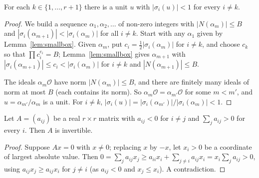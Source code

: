 \begin{lemma}\label{lem:onebig}
For each $k\in\{1,\dots,r+1\}$ there is a unit $u$ with $|\sigma_i(u)|<1$ for every $i\ne k$.
\end{lemma}
\begin{proof}
We build a sequence $\alpha_1,\alpha_2,\dots$ of non-zero integers with $|N(\alpha_m)|\le B$ and $|\sigma_i(\alpha_{m+1})|<
|\sigma_i(\alpha_m)|$ for all $i\ne k$. Start with any $\alpha_1$ given by Lemma~\ref{lem:smallbox}. Given $\alpha_m$, put
$c_i=\frac12|\sigma_i(\alpha_m)|$ for $i\ne k$, and choose $c_k$ so that $\prod c_i^{e_i}=B$; Lemma~\ref{lem:smallbox} gives
$\alpha_{m+1}$ with $|\sigma_i(\alpha_{m+1})|\le c_i<|\sigma_i(\alpha_m)|$ for $i\ne k$ and $|N(\alpha_{m+1})|\le B$.

The ideals $\alpha_m\mathcal O$ have norm $|N(\alpha_m)|\le B$, and there are finitely many ideals of norm at most $B$
(each contains its norm). So $\alpha_m\mathcal O=\alpha_{m'}\mathcal O$ for some $m<m'$, and $u=\alpha_{m'}/\alpha_m$ is a
unit. For $i\ne k$, $|\sigma_i(u)|=|\sigma_i(\alpha_{m'})|/|\sigma_i(\alpha_m)|<1$.
\end{proof}

\begin{lemma}\label{lem:dominant}
Let $A=(a_{ij})$ be a real $r\times r$ matrix with $a_{ij}<0$ for $i\ne j$ and $\sum_ja_{ij}>0$ for every $i$. Then $A$
is invertible.
\end{lemma}
\begin{proof}
Suppose $Ax=0$ with $x\ne0$; replacing $x$ by $-x$, let $x_i>0$ be a coordinate of largest absolute value. Then
$0=\sum_ja_{ij}x_j\ge a_{ii}x_i+\sum_{j\ne i}a_{ij}x_i=x_i\sum_ja_{ij}>0$, using $a_{ij}x_j\ge a_{ij}x_i$ for $j\ne i$
(as $a_{ij}<0$ and $x_j\le x_i$). A contradiction.
\end{proof}

